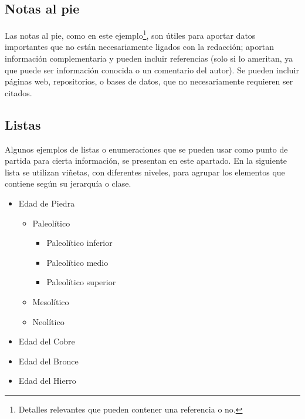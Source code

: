 


\subsection{Notas al pie}
\label{sec:notas}

Las notas al pie, como en este ejemplo\footnote{Detalles relevantes que pueden contener una referencia \citep{bib3} o no.}, son útiles para aportar datos importantes que no están necesariamente ligados con la redacción; aportan información complementaria y pueden incluir referencias (solo si lo ameritan, ya que puede ser información conocida o un comentario del autor). Se pueden incluir páginas web, repositorios, o bases de datos, que no necesariamente requieren ser citados.

\subsection{Listas}
\label{sec:listas}

Algunos ejemplos de listas o enumeraciones que se pueden usar como punto de partida para cierta información, se presentan en este apartado. En la siguiente lista se utilizan viñetas, con diferentes niveles, para agrupar los elementos que contiene según su jerarquía o clase. 

\begin{itemize}
\item Edad de Piedra
	\begin{itemize}
	\item Paleolítico
		\begin{itemize}
		\item Paleolítico inferior
		\item Paleolítico medio
		\item Paleolítico superior
	\end{itemize}
	\item Mesolítico
	\item Neolítico
	\end{itemize}
\item Edad del Cobre
\item Edad del Bronce
\item Edad del Hierro
\end{itemize} 


